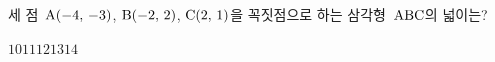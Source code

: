 세 점~$\mathrm{A}(-4,\,-3)$, $\mathrm{B}(-2,\,2)$, $\mathrm{C}(2,\,1)$을 꼭짓점으로 하는 삼각형~$\mathrm{ABC}$의 넓이는?
\begin{choices32}{$10$}{$11$}{$12$}{$13$}{$14$}\end{choices32}
